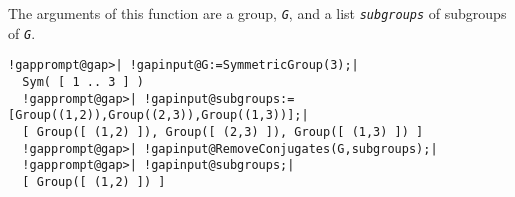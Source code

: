 \documentclass[a4paper,11pt]{report}
\begin{document}
{{{ The arguments of this function are a group, \mbox{\texttt{\mdseries\slshape G}}, and a list \mbox{\texttt{\mdseries\slshape subgroups}} of subgroups of \mbox{\texttt{\mdseries\slshape G}}. 

 }

 

 
\begin{Verbatim}[commandchars=!@|,fontsize=\small,frame=single,label=Example]
  !gapprompt@gap>| !gapinput@G:=SymmetricGroup(3);|
  Sym( [ 1 .. 3 ] )
  !gapprompt@gap>| !gapinput@subgroups:=[Group((1,2)),Group((2,3)),Group((1,3))];|
  [ Group([ (1,2) ]), Group([ (2,3) ]), Group([ (1,3) ]) ]
  !gapprompt@gap>| !gapinput@RemoveConjugates(G,subgroups);|
  !gapprompt@gap>| !gapinput@subgroups;|
  [ Group([ (1,2) ]) ]
\end{Verbatim}
 }

 }

   
\end{document}
